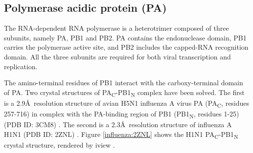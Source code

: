 
\subsection{Polymerase acidic protein (PA)}

The RNA-dependent RNA polymerase is a heterotrimer composed of three subunits, namely PA, PB1 and PB2. PA contains the endonuclease domain, PB1 carries the polymerase active site, and PB2 includes the capped-RNA recognition domain. All the three subunits are required for both viral transcription and replication.%

The amino-terminal residues of PB1 interact with the carboxy-terminal domain of PA. Two crystal structures of PA\textsubscript{C}-PB1\textsubscript{N} complex have been solved. The first is a 2.9\AA\ resolution structure of avian H5N1 influenza A virus PA (PA\textsubscript{C}, residues 257-716) in complex with the PA-binding region of PB1 (PB1\textsubscript{N}, residues 1-25) (PDB ID: 3CM8) \citep{1540}. The second is a 2.3\AA\ resolution structure of influenza A H1N1 (PDB ID: 2ZNL) \citep{1141}. Figure \ref{influenza:2ZNL} shows the H1N1 PA\textsubscript{C}-PB1\textsubscript{N} crystal structure, rendered by iview \citep{1366}.

